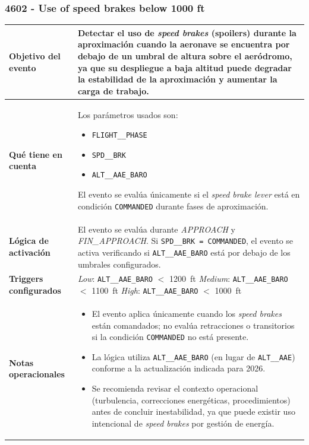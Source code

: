 \documentclass[11pt,a4paper]{article}
\begin{document}
	\subsubsection{4602 - Use of speed brakes below 1000 ft}
	\renewcommand{\arraystretch}{1.3}
	\begin{longtable}{p{5cm} p{9.5cm}}
		\hline
		\textbf{Objetivo del evento} &
		Detectar el uso de \textit{speed brakes} (spoilers) durante la aproximación cuando la aeronave se encuentra por debajo de un umbral de altura sobre el aeródromo, ya que su despliegue a baja altitud puede degradar la estabilidad de la aproximación y aumentar la carga de trabajo. \\
		\hline
		\textbf{Qué tiene en cuenta} & Los parámetros usados son:
		\begin{itemize}
			\item \texttt{FLIGHT\_\_PHASE}
			\item \texttt{SPD\_\_BRK}
			\item \texttt{ALT\_\_AAE\_BARO}
		\end{itemize}
		El evento se evalúa únicamente si el \textit{speed brake lever} está en condición \texttt{COMMANDED} durante fases de aproximación. \\
		\hline
		\textbf{Lógica de activación} &
		El evento se evalúa durante \textit{APPROACH} y \textit{FIN\_APPROACH}. Si \texttt{SPD\_\_BRK = COMMANDED}, el evento se activa verificando si \texttt{ALT\_\_AAE\_BARO} está por debajo de los umbrales configurados. \\
		\hline
		\textbf{Triggers configurados} &
		\textit{Low}: \texttt{ALT\_\_AAE\_BARO} $<$ \SI{1200}{ft} \newline
		\textit{Medium}: \texttt{ALT\_\_AAE\_BARO} $<$ \SI{1100}{ft} \newline
		\textit{High}: \texttt{ALT\_\_AAE\_BARO} $<$ \SI{1000}{ft} \\
		\hline
		\textbf{Notas operacionales} &
		\begin{itemize}
			\item El evento aplica únicamente cuando los \textit{speed brakes} están comandados; no evalúa retracciones o transitorios si la condición \texttt{COMMANDED} no está presente.
			\item La lógica utiliza \texttt{ALT\_\_AAE\_BARO} (en lugar de \texttt{ALT\_\_AAE}) conforme a la actualización indicada para 2026.
			\item Se recomienda revisar el contexto operacional (turbulencia, correcciones energéticas, procedimientos) antes de concluir inestabilidad, ya que puede existir uso intencional de \textit{speed brakes} por gestión de energía.
		\end{itemize} \\
		\hline
	\end{longtable} \newpage
	
\end{document}
